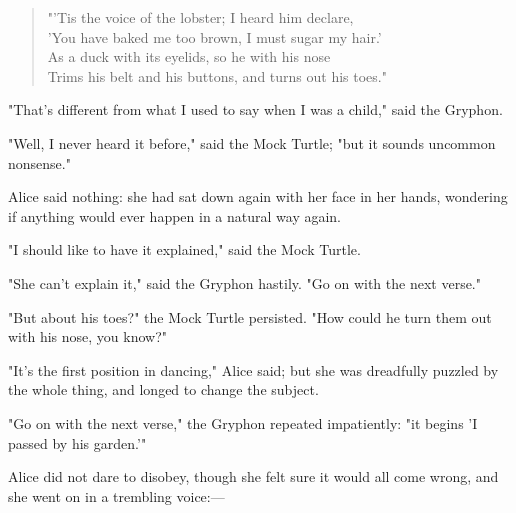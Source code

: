 \begin{quote}
"'Tis the voice of the lobster; I heard him declare,\\
'You have baked me too brown, I must sugar my hair.'\\
As a duck with its eyelids, so he with his nose\\
Trims his belt and his buttons, and turns out his toes."
\end{quote}



"That's different from what I used to say when I was a child," said the Gryphon.

​"Well, I never heard it before," said the Mock Turtle; "but it sounds uncommon nonsense."

Alice said nothing: she had sat down again with her face in her hands, wondering if anything would ever happen in a natural way again.

"I should like to have it explained," said the Mock Turtle.

"She can't explain it," said the Gryphon hastily. "Go on with the next verse."

"But about his toes?" the Mock Turtle persisted. "How could he turn them out with his nose, you know?"

"It's the first position in dancing," Alice said; but she was dreadfully puzzled by the whole thing, and longed to change the subject.

"Go on with the next verse," the Gryphon repeated impatiently: "it begins 'I passed by his garden.'"

Alice did not dare to disobey, though she felt sure it would all come wrong, and she went on in a trembling voice:—

